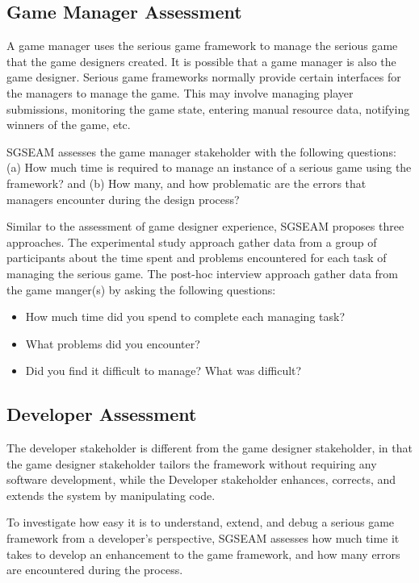 \subsection{Game Manager Assessment}

A game manager uses the serious game framework to manage the serious game that the game
designers created. It is possible that a game manager is also the game designer.
Serious game frameworks normally provide certain interfaces for the managers to manage the
game. This may involve managing player submissions, monitoring the game state, entering
manual resource data, notifying winners of the game, etc.

SGSEAM assesses the game manager stakeholder with the following questions: (a) How much time is
required to manage an instance of a serious game using the framework? and (b) How many,
and how problematic are the errors that managers encounter during the design process?

Similar to the assessment of game designer experience, SGSEAM proposes three approaches. The
experimental study approach gather data from a group of participants about the time spent and
problems encountered for each task of managing the serious game. The post-hoc interview approach
gather data from the game manger(s) by asking the following questions:

\begin{itemize}
\item How much time did you spend to complete each managing task?
\item What problems did you encounter?
\item Did you find it difficult to manage? What was difficult?
\end{itemize}

\subsection{Developer Assessment}

The developer stakeholder is different from the game designer stakeholder, in that the
game designer stakeholder tailors the framework without requiring any software
development, while the Developer stakeholder enhances, corrects, and extends the system by
manipulating code. 

To investigate how easy it is to understand, extend, and debug a serious game
framework from a developer's perspective, SGSEAM assesses how much time it takes to develop an
enhancement to the game framework, and how many errors are encountered
during the process.

